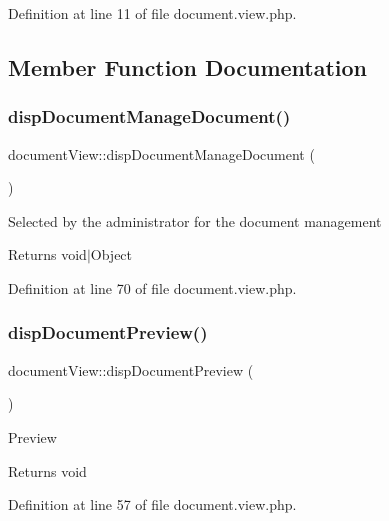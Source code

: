 Definition at line 11 of file document.\+view.\+php.



\subsection{Member Function Documentation}
\hypertarget{classdocumentView_a5a358d7106e98e64179115b3966639de}{}\label{classdocumentView_a5a358d7106e98e64179115b3966639de} 
\subsubsection{\texorpdfstring{disp\+Document\+Manage\+Document()}{dispDocumentManageDocument()}}
{\footnotesize\ttfamily document\+View\+::disp\+Document\+Manage\+Document (\begin{DoxyParamCaption}{ }\end{DoxyParamCaption})}

Selected by the administrator for the document management \begin{DoxyReturn}{Returns}
void$\vert$\+Object 
\end{DoxyReturn}


Definition at line 70 of file document.\+view.\+php.

\hypertarget{classdocumentView_af93051602dbf3254f05d1d0ada402907}{}\label{classdocumentView_af93051602dbf3254f05d1d0ada402907} 
\subsubsection{\texorpdfstring{disp\+Document\+Preview()}{dispDocumentPreview()}}
{\footnotesize\ttfamily document\+View\+::disp\+Document\+Preview (\begin{DoxyParamCaption}{ }\end{DoxyParamCaption})}

Preview \begin{DoxyReturn}{Returns}
void 
\end{DoxyReturn}


Definition at line 57 of file document.\+view.\+php.

\hypertarget{classdocumentView_aab058bbbfedaeb2d9b6bb1505d5e3b9c}{}\label{classdocumentView_aab058bbbfedaeb2d9b6bb1505d5e3b9c} 
